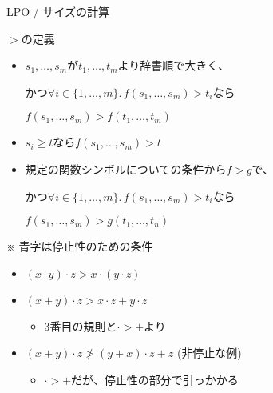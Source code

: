 \documentclass[dvipdfmx,11pt,notheorems]{beamer}
\theoremstyle{definition}
\newcommand{\blue}[1]{{\color{blue} #1}}
\begin{document}
\begin{frame}{LPO / サイズの計算}
  \begin{block}{$>$の定義}
    \begin{itemize}
      \item $s_1, \ldots, s_m$が$t_1, \ldots, t_m$より辞書順で大きく、

      \blue{かつ$\forall i \in \{1, \ldots, m\}.\, f(s_1, \ldots, s_m) > t_i$なら}

      $f(s_1, \ldots, s_m) > f(t_1, \ldots, t_m)$

      \item $s_i \geq t$なら$f(s_1, \ldots, s_m) > t$

      \item 規定の関数シンボルについての条件から$f>g$で、

      \blue{かつ$\forall i \in \{1, \ldots, m\}.\, f(s_1, \ldots, s_m) > t_i$なら}

      $f(s_1, \ldots, s_m) > g(t_1, \ldots, t_n)$
    \end{itemize}

    ※\blue{青字}は停止性のための条件
  \end{block}

  \begin{exampleblock}{}
    \begin{itemize}
      \item $(x \cdot y) \cdot z > x \cdot (y \cdot z)$
      \item $(x + y) \cdot z > x \cdot z + y \cdot z$
      \begin{itemize}
        \item 3番目の規則と$\cdot > +$より
      \end{itemize}
      \item $(x + y) \cdot z \not> (y + x) \cdot z + z$ \hspace{10pt} (非停止な例)
      \begin{itemize}
        \item $\cdot > +$だが、停止性の部分で引っかかる
      \end{itemize}
    \end{itemize}
  \end{exampleblock}
\end{frame}
\end{document}
